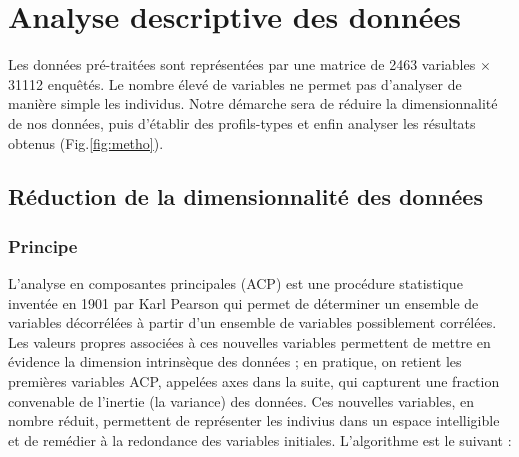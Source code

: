 \documentclass[11pt,fleqn,openany,frenchb]{book} %
\def\NOTE#1{\footnote{MS : #1}}
\begin{document}
\chapter{Analyse descriptive des données}
Les données pré-traitées sont représentées par une matrice de 2463 variables $\times$ 31112 enquêtés. Le nombre élevé de variables ne permet pas d'analyser de manière simple les individus. Notre démarche sera de réduire la dimensionnalité de nos données, puis d'établir des profils-types et enfin analyser les résultats obtenus (Fig.\ref{fig:metho}). 
\section{Réduction de la dimensionnalité des données}
\subsection{Principe}
L'analyse en composantes principales (ACP) est une procédure statistique inventée en 1901 par Karl Pearson qui permet de déterminer un ensemble de variables décorrélées à partir d'un ensemble de variables possiblement corrélées. Les valeurs propres associées à ces nouvelles variables permettent de mettre en évidence la dimension intrinsèque des données ; en pratique, on retient les premières variables ACP, appelées axes dans la suite, qui capturent une fraction convenable de l'inertie (la variance) des données. Ces nouvelles variables, en nombre réduit, permettent de représenter les indivius dans un espace intelligible et de remédier à la redondance des variables initiales. L'algorithme est le suivant : \vspace{0.2cm}\par
\end{document}
